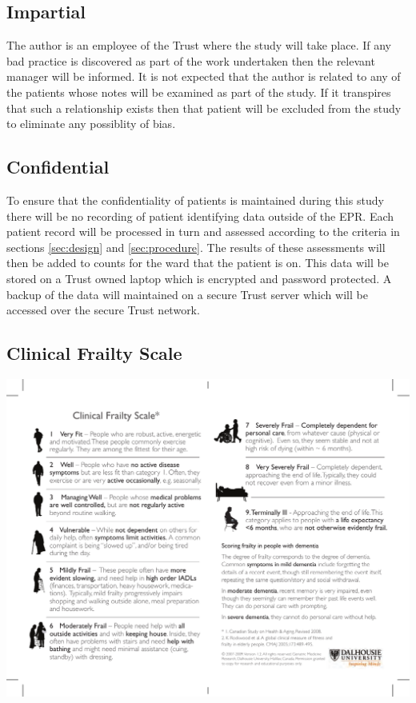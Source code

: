 \documentclass
[
	12pt,
	a4paper,
	oneside,
]{article}
\begin{document}
\subsection{Impartial}
The author is an employee of the Trust where the study will take place. If any bad
practice is discovered as part of the work undertaken then the relevant manager
will be informed. It is not expected that the author is related to any of the patients
whose notes will be examined as part of the study. If it transpires that such a 
relationship exists then that patient will be excluded from the study to eliminate
any possiblity of bias.

\subsection{Confidential}
To ensure that the confidentiality of patients is maintained during this study there
will be no recording of patient identifying data outside of the EPR. Each patient
record will be processed in turn and assessed according to the criteria in 
sections \ref{sec:design} and \ref{sec:procedure}. The results of these assessments
will then be added to counts for the ward that the patient is on. This data will be
stored on a Trust owned laptop which is encrypted and password protected. A backup 
of the data will maintained on a secure Trust server which will be accessed over
the secure Trust network.


\clearpage
\printbibliography[prenote=needsfixing]

\clearpage
\begin{appendix}
\section{Clinical Frailty Scale}
\label{appendix:CFS}
\includegraphics[width=\textwidth]{CFS}
\end{appendix}
\end{document}

